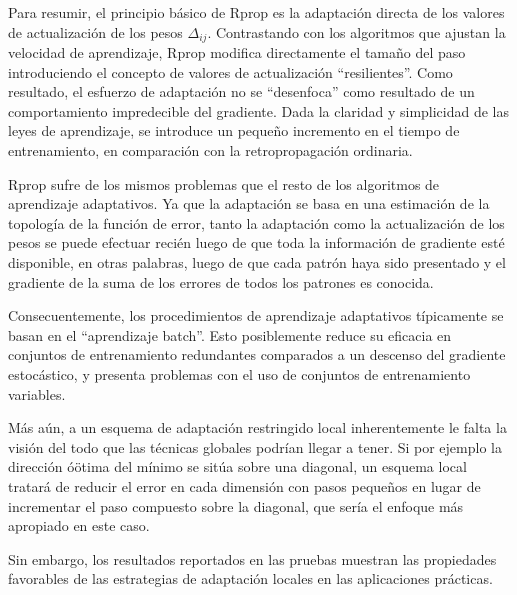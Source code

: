 Para resumir, el principio básico de Rprop es la adaptación directa de
los valores de actualización de los pesos $\Delta_{ij}$. Contrastando
con los algoritmos que ajustan la velocidad de aprendizaje, Rprop
modifica directamente el tamaño del paso introduciendo el concepto de
valores de actualización ``resilientes''. Como resultado, el esfuerzo
de adaptación no se ``desenfoca'' como resultado de un comportamiento
impredecible del gradiente. Dada la claridad y simplicidad de las
leyes de aprendizaje, se introduce un pequeño incremento en el tiempo de
entrenamiento, en comparación con la retropropagación ordinaria.

Rprop sufre de los mismos problemas que el resto de los algoritmos de
aprendizaje adaptativos. Ya que la adaptación se basa en una
estimación de la topología de la función de error, tanto la adaptación
como la actualización de los pesos se puede efectuar recién luego de
que toda la información de gradiente esté disponible, en otras
palabras, luego de que cada patrón haya sido presentado y el gradiente
de la suma de los errores de todos los patrones es conocida.

Consecuentemente, los procedimientos de aprendizaje adaptativos
típicamente se basan en el ``aprendizaje batch''. Esto posiblemente
reduce su eficacia en conjuntos de entrenamiento redundantes
comparados a un descenso del gradiente estocástico, y presenta
problemas con el uso de conjuntos de entrenamiento variables.

Más aún, a un esquema de adaptación restringido local inherentemente le
falta la visión del todo que las técnicas globales podrían llegar a
tener. Si por ejemplo la dirección óötima del mínimo se sitúa sobre
una diagonal, un esquema local tratará de reducir el error en cada
dimensión con pasos pequeños en lugar de incrementar el paso compuesto
sobre la diagonal, que sería el enfoque más apropiado en este caso.

Sin embargo, los resultados reportados en las pruebas
\cite{riedmiller} muestran las propiedades favorables de las
estrategias de adaptación locales en las aplicaciones prácticas.

